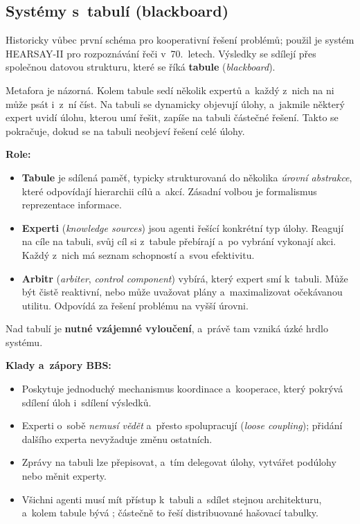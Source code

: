 \documentclass[11pt,a4paper]{article}
\theoremstyle{definition}
\begin{document}
\subsection{Systémy s~tabulí (blackboard)}

\begin{defbox}
Historicky vůbec první schéma pro kooperativní řešení problémů; použil je systém HEARSAY-II pro
rozpoznávání řeči v~70.~letech. Výsledky se sdílejí přes společnou datovou strukturu, které se
říká \textbf{tabule} (\emph{blackboard}).

Metafora je názorná. Kolem tabule sedí několik expertů a~každý z~nich na ni může psát i~z~ní
číst. Na tabuli se dynamicky objevují úlohy, a~jakmile některý expert uvidí úlohu, kterou umí
řešit, zapíše na tabuli částečné řešení. Takto se pokračuje, dokud se na tabuli neobjeví řešení
celé úlohy.

\textbf{Role:}
\begin{itemize}
\item \textbf{Tabule} je sdílená paměť, typicky strukturovaná do několika \emph{úrovní
  abstrakce}, které odpovídají hierarchii cílů a~akcí. Zásadní volbou je formalismus
  reprezentace informace.
\item \textbf{Experti} (\emph{knowledge sources}) jsou agenti řešící konkrétní typ úlohy.
  Reagují na cíle na tabuli, svůj cíl si z~tabule přebírají a~po vybrání vykonají akci. Každý
  z~nich má seznam schopností a~svou efektivitu.
\item \textbf{Arbitr} (\emph{arbiter}, \emph{control component}) vybírá, který expert smí
  k~tabuli. Může být čistě reaktivní, nebo může uvažovat plány a~maximalizovat očekávanou
  utilitu. Odpovídá za řešení problému na vyšší úrovni.
\end{itemize}
Nad tabulí je \textbf{nutné vzájemné vyloučení}, a~právě tam vzniká úzké hrdlo systému.
\end{defbox}

\textbf{Klady a~zápory BBS:}
\begin{itemize}
\item[$+$] Poskytuje jednoduchý mechanismus koordinace a~kooperace, který pokrývá sdílení úloh
  i~sdílení výsledků.
\item[$+$] Experti o~sobě \emph{nemusí vědět} a~přesto spolupracují (\emph{loose coupling});
  přidání dalšího experta nevyžaduje změnu ostatních.
\item[$+$] Zprávy na tabuli lze přepisovat, a~tím delegovat úlohy, vytvářet podúlohy nebo měnit
  experty.
\item[$-$] Všichni agenti musí mít přístup k~tabuli a~sdílet stejnou architekturu, a~kolem
  tabule bývá ; částečně to řeší distribuované hašovací tabulky.
\end{itemize}
\end{document}
